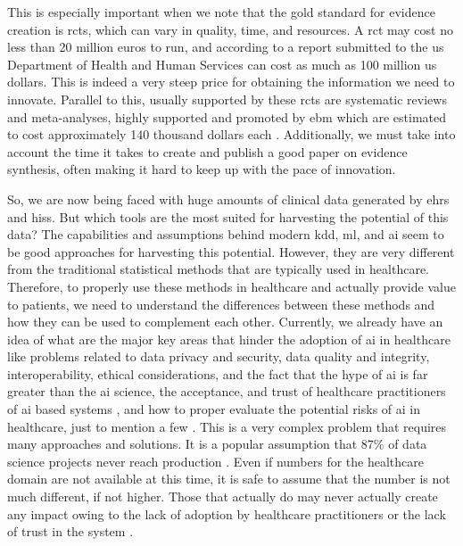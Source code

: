 

This is especially important when we note that the gold standard for evidence creation is \acp{rct}, which can vary in quality, time, and resources. A \ac{rct} may cost no less than 20 million euros to run, and according to a report submitted to the \ac{us} Department of Health and Human Services \cite{sertkayaaylinEXAMINATIONCLINICALTRIAL2014} can cost as much as 100 million \ac{us} dollars. This is indeed a very steep price for obtaining the information we need to innovate. Parallel to this, usually supported by these \acp{rct} are systematic reviews and meta-analyses, highly supported and promoted by \ac{ebm} which are estimated to cost approximately 140 thousand dollars each \cite{michelsonSignificantCostSystematic2019}. Additionally, we must take into account the time it takes to create and publish a good paper on evidence synthesis, often making it hard to keep up with the pace of innovation.

So, we are now being faced with huge amounts of clinical data generated by \acp{ehr} and \acp{his}. But which tools are the most suited for harvesting the potential of this data? 
The capabilities and assumptions behind modern \ac{kdd}, \ac{ml}, and \ac{ai} seem to be good approaches for harvesting this potential. However, they are very different from the traditional statistical methods that are typically used in healthcare.
Therefore, to properly use these methods in healthcare and actually provide value to patients, we need to understand the differences between these methods and how they can be used to complement each other.
Currently, we already have an idea of what are the major key areas that hinder the adoption of \ac{ai} in healthcare like problems related to data privacy and security, data quality and integrity, interoperability, ethical considerations, and the fact that the hype of \ac{ai} is far greater than the \ac{ai} science, the acceptance, and trust of healthcare practitioners of \ac{ai} based systems \cite{muhiyaddinImpactClinicalDecision2020,kilsdonkFactorsInfluencingImplementation2017}, and how to proper evaluate the potential risks of \ac{ai} in healthcare, just to mention a few \cite{topolHighperformanceMedicineConvergence2019a}.
This is a very complex problem that requires many approaches and solutions. It is a popular assumption that 87\% of data science projects never reach production \cite{Why87Data2019}. Even if numbers for the healthcare domain are not available at this time, it is safe to assume that the number is not much different, if not higher. Those that actually do may never actually create any impact owing to the lack of adoption by healthcare practitioners or the lack of trust in the system \cite{walkerModelGuidedDecisionMakingThromboprophylaxis2023}.

